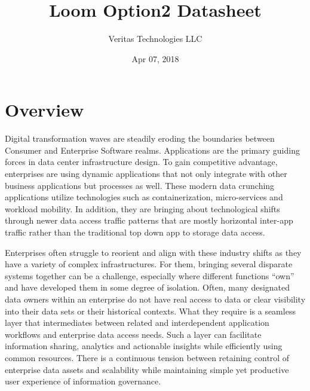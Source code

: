 \documentclass[letterpaper,10pt,english]{sphinxhowto}
\title{Loom Option2 Datasheet}
\date{Apr 07, 2018}
\author{Veritas Technologies LLC}
\begin{document}
\maketitle
\sphinxtableofcontents
{}\label{\detokenize{col/ds/mcdmp_ds_opt2::doc}}


\begin{figure}[htbp]
\centering

\noindent{}
\end{figure}


\section{Overview}
\label{\detokenize{col/ds/mcdmp_ds_opt2:overview}}\label{\detokenize{col/ds/mcdmp_ds_opt2:mcdmp-ds-opt2}}\label{\detokenize{col/ds/mcdmp_ds_opt2:datasheet-loom-veritas-multi-cloud-data-management-platform-opt2}}
Digital transformation waves are steadily eroding the boundaries between Consumer and Enterprise Software realms. Applications are the primary guiding forces in data center infrastructure design. To gain competitive advantage, enterprises are using dynamic applications that not only integrate with other business applications but processes as well. These modern data crunching applications utilize technologies such as containerization, micro-services and workload mobility.  In addition, they are bringing about technological shifts through newer data access traffic patterns that are mostly horizontal inter-app traffic rather than the traditional top down app to storage data access.

Enterprises often struggle to reorient and align with these industry shifts as they have a variety of complex infrastructures. For them, bringing several disparate systems together can be a challenge, especially where different functions “own” and have developed them in some degree of isolation. Often, many designated data owners within an enterprise do not have real access to data or clear visibility into their data sets or their historical contexts. What they require is a seamless layer that intermediates between related and interdependent application workflows and enterprise data access needs. Such a layer can facilitate information sharing, analytics and actionable insights while efficiently using common resources.  There is a continuous tension between retaining control of enterprise data assets and scalability while maintaining simple yet productive user experience of information governance.
\end{document}
